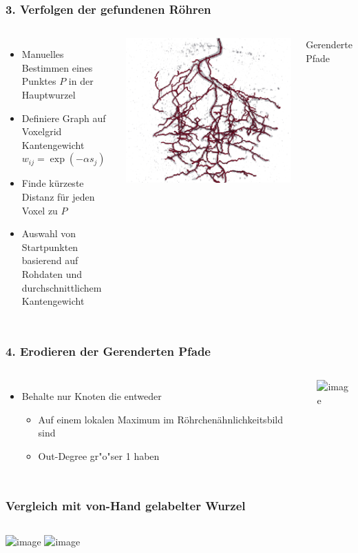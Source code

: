 \documentclass[final,ngerman,ignorenonframetext,compress]{beamer}
\begin{document}
\begin{frame}
	\frametitle{3. Verfolgen der gefundenen R\"ohren}
	\begin{columns}
		\begin{itemize}
			\item Manuelles Bestimmen eines Punktes $P$ in der
				Hauptwurzel
			\item Definiere Graph auf Voxelgrid
				Kantengewicht $w_{ij}=\exp(-\alpha s_j)$
			\item Finde k\"urzeste Distanz f\"ur jeden Voxel zu $P$
			\item Auswahl von Startpunkten basierend auf
				Rohdaten und durchschnittlichem Kantengewicht
		\end{itemize}
		\includegraphics[width=\linewidth]{img2/rendered-paths-4.png}

		\begin{center}
			Gerenderte Pfade
		\end{center}
	\end{columns}
\end{frame}

\begin{frame}
	\frametitle{4. Erodieren der Gerenderten Pfade}
	\begin{columns}
		\column{.5\linewidth}
		\begin{itemize}
			\item Behalte nur Knoten die entweder
				\begin{itemize}
					\item Auf einem lokalen Maximum im R\"ohrchen\"ahnlichkeitsbild sind
					\item Out-Degree gr"o"ser 1 haben
				\end{itemize}
		\end{itemize}
		\column{.5\linewidth}
		\includegraphics<1>[width=\linewidth]{img2/path-ours-4.png}
	\end{columns}
\end{frame}

\begin{frame}
	\frametitle{Vergleich mit von-Hand gelabelter Wurzel}
	\begin{columns}
		\includegraphics<1>[width=\linewidth]{img2/path-traces-4.png}
		\includegraphics<1>[width=\linewidth]{img2/raw-4.png}
	\end{columns}
\end{frame}
\end{document}
